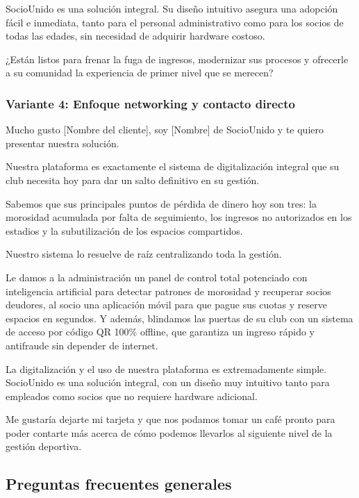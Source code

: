 SocioUnido es una solución integral. Su diseño intuitivo asegura una adopción fácil e inmediata, tanto para el personal administrativo como para los socios de todas las edades, sin necesidad de adquirir hardware costoso.

¿Están listos para frenar la fuga de ingresos, modernizar sus procesos y ofrecerle a su comunidad la experiencia de primer nivel que se merecen?

\subsubsection{Variante 4: Enfoque networking y contacto directo}

Mucho gusto [Nombre del cliente], soy [Nombre] de SocioUnido y te quiero presentar nuestra solución.

Nuestra plataforma es exactamente el sistema de digitalización integral que su club necesita hoy para dar un salto definitivo en su gestión.

Sabemos que sus principales puntos de pérdida de dinero hoy son tres: la morosidad acumulada por falta de seguimiento, los ingresos no autorizados en los estadios y la subutilización de los espacios compartidos.

Nuestro sistema lo resuelve de raíz centralizando toda la gestión.

Le damos a la administración un panel de control total potenciado con inteligencia artificial para detectar patrones de morosidad y recuperar socios deudores, al socio una aplicación móvil para que pague sus cuotas y reserve espacios en segundos. Y además, blindamos las puertas de su club con un sistema de acceso por código QR 100\% offline, que garantiza un ingreso rápido y antifraude sin depender de internet.

La digitalización y el uso de nuestra plataforma es extremadamente simple. SocioUnido es una solución integral, con un diseño muy intuitivo tanto para empleados como socios que no requiere hardware adicional.

Me gustaría dejarte mi tarjeta y que nos podamos tomar un café pronto para poder contarte más acerca de cómo podemos llevarlos al siguiente nivel de la gestión deportiva.

\newpage

\subsection{Preguntas frecuentes generales}

